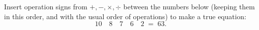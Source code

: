 Insert operation signs from $+,-,\times,\div$ between the numbers below (keeping them in this order, and with the usual order of operations) to make a true equation:
\[
10\quad 8\quad 7\quad 6\quad 2\;=\;63 .
\]
